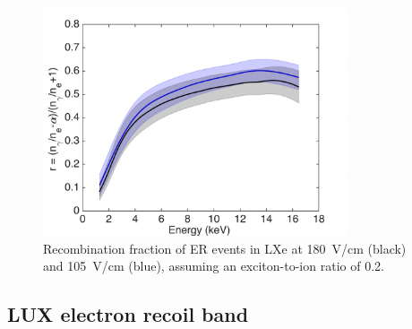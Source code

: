 \begin{figure}[t!]
\includegraphics[width=90mm]{fig10.pdf}
\caption{Recombination fraction of ER events in LXe at 180~V/cm (black) and 105~V/cm (blue), assuming an exciton-to-ion ratio of 0.2.}
\label{fig:recombination}
\end{figure}

\subsection{LUX electron recoil band}


